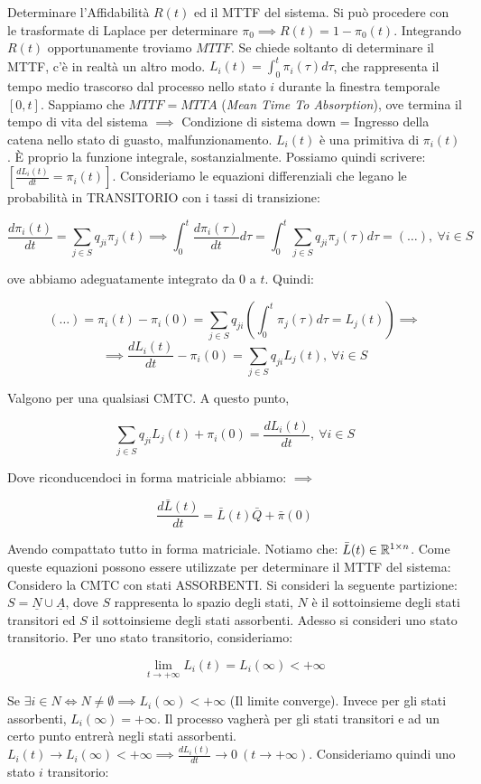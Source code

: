 Determinare l'Affidabilità $R(t)$ ed il MTTF del sistema. Si può procedere con le trasformate di Laplace per determinare $\pi_0 \implies R(t)=1-\pi_0(t)$. Integrando $R(t)$ opportunamente troviamo $MTTF$. Se chiede soltanto di determinare il MTTF, c'è in realtà un altro modo. $L_i(t)=\int_0^t{\pi_i(\tau)d\tau}$, che rappresenta il tempo medio trascorso dal processo nello stato $i$ durante la finestra temporale $[0,t]$. Sappiamo che $MTTF=MTTA$ (\textit{Mean Time To Absorption}), ove termina il tempo di vita del sistema $\implies$ Condizione di sistema down = Ingresso della catena nello stato di guasto, malfunzionamento. $L_i(t)$ è una primitiva di $\pi_i(t)$. \`E proprio la funzione integrale, sostanzialmente. Possiamo quindi scrivere: $[\frac{d L_i(t)}{dt} =\pi_i(t)]$. Consideriamo le equazioni differenziali che legano le probabilità in TRANSITORIO con i tassi di transizione:

\[
	\frac{d \pi_i(t)}{dt} = \sum_{j\in S}{q_{ji}\pi_j(t)} \implies
	\int_0^t{\frac{d \pi_i(\tau)}{dt}d\tau} = \int_0^t{\sum_{j\in S}{q_{ji}\pi_j(\tau)d\tau}} = (\dots),\ \forall i\in S
\]

ove abbiamo adeguatamente integrato da 0 a $t$. Quindi:

\[
	(\dots) = \pi_i(t)-\pi_i(0) = \sum_{j\in S}{q_{ji}(\int_0^t{\pi_j(\tau)d\tau}=L_j(t))} \implies
\]
\[
	\implies \frac{d L_i(t)}{dt} - \pi_i(0) = \sum_{j\in S}{q_{ji}L_j(t)},\ \forall i\in S
\]

Valgono per una qualsiasi CMTC. A questo punto, 

\[
	\sum_{j\in S}{q_{ji}L_j(t)} +\pi_i(0) = \frac{d L_i(t)}{dt},\ \forall i\in S
\]

Dove riconducendoci in forma matriciale abbiamo: $\implies$

\[
	\frac{d \bar{L}(t)}{dt} = \bar{L}(t)\bar{Q} + \bar{\pi}(0)
\]

Avendo compattato tutto in forma matriciale. Notiamo che: $\bar{L}(t)\in \mathbb{R}^{1\times n}$. Come queste equazioni possono essere utilizzate per determinare il MTTF del sistema: Considero la CMTC con stati ASSORBENTI. Si consideri la seguente partizione: $\mathit{S} = \underline{N} \cup \underline{A}$, dove $\mathit{S}$ rappresenta lo spazio degli stati, $N$ è il sottoinsieme degli stati transitori ed $S$ il sottoinsieme degli stati assorbenti. Adesso si consideri uno stato transitorio. Per uno stato transitorio, consideriamo:

\[
	\lim_{t\to +\infty}{L_i(t)} = L_i(\infty) < +\infty
\]

Se $\exists i\in N \iff N\neq \emptyset \implies L_i(\infty) < +\infty$ (Il limite converge). Invece per gli stati assorbenti, $L_i(\infty)=+\infty$. Il processo vagherà per gli stati transitori e ad un certo punto entrerà negli stati assorbenti. $L_i(t)\to L_i(\infty) < +\infty \implies \frac{d L_i(t)}{dt} \to 0\ (t\to +\infty)$. Consideriamo quindi uno stato $i$ transitorio:

